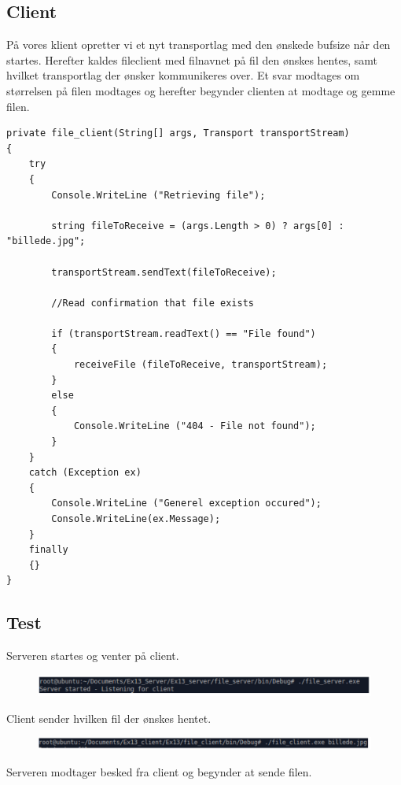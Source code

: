 \subsection{Client}

På vores klient opretter vi et nyt transportlag med den ønskede bufsize når den startes. Herefter kaldes fileclient med filnavnet på fil den ønskes hentes, samt hvilket transportlag der ønsker kommunikeres over. Et svar modtages om størrelsen på filen modtages og herefter begynder clienten at modtage og gemme filen.

\begin{lstlisting}
private file_client(String[] args, Transport transportStream)
{
	try
	{
		Console.WriteLine ("Retrieving file");
		
		string fileToReceive = (args.Length > 0) ? args[0] : "billede.jpg";
		
		transportStream.sendText(fileToReceive);
		
		//Read confirmation that file exists
		
		if (transportStream.readText() == "File found") 
		{
			receiveFile (fileToReceive, transportStream);
		} 
		else 
		{
			Console.WriteLine ("404 - File not found");
		}
	}
	catch (Exception ex)
	{
		Console.WriteLine ("Generel exception occured");
		Console.WriteLine(ex.Message);
	}
	finally 
	{}
}
\end{lstlisting}

\subsection{Test}
Serveren startes og venter på client.

\begin{figure}[h]
	\centering
	\includegraphics[width=0.7\linewidth]{figs/test1}
	\caption{}
	\label{fig:test1}
\end{figure}

Client sender hvilken fil der ønskes hentet.

\begin{figure}[h]
	\centering
	\includegraphics[width=0.7\linewidth]{figs/test2}
	\caption{}
	\label{fig:test2}
\end{figure}

Serveren modtager besked fra client og begynder at sende filen.

